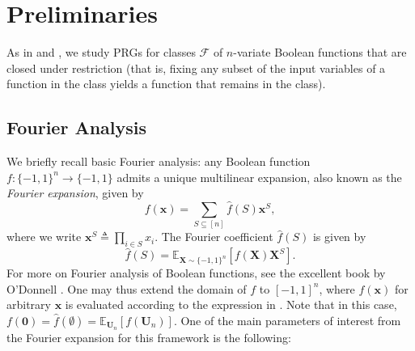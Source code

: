 \section{Preliminaries}
\label{sec:preliminaries}
As in \cite{CHHL} and \cite{CHLT}, we study PRGs for classes $\mathcal{F}$ of $n$-variate Boolean functions that are closed under restriction (that is, fixing any subset of the input variables of a function in the class yields a function that remains in the class). 














































\subsection{Fourier Analysis} \label{subsec:fourier}
We briefly recall basic Fourier analysis: any Boolean function $f:\{-1,1\}^n \to \{-1,1\}$ admits a unique multilinear expansion, also known as the \emph{Fourier expansion}, given by 
\begin{equation}
\label{eq:fourierexpansion}
    f(\mathbf{x})=\sum_{S\subseteq [n]} \hat{f}(S)\mathbf{x}^S,
\end{equation}
where we write $\mathbf{x}^S\triangleq \prod_{i\in S} x_i$. The   Fourier coefficient $\hat{f}(S)$ is given by
\begin{equation*}
    \hat{f}(S)=\mathbb{E}_{\mathbf{X}\sim \{-1,1\}^n}[f(\mathbf{X})\mathbf{X}^S].
\end{equation*}
For more on Fourier analysis of Boolean functions, see the excellent book by O'Donnell \cite{ODonnelBook}. One may thus extend the domain of $f$ to $[-1,1]^n$, where $f(\mathbf{x})$ for arbitrary $\mathbf{x}$ is evaluated according to the expression in . Note that in this case, $f(\mathbf{0})=\hat{f}(\emptyset)=\mathbb{E}_{\mathbf{U}_n}[f(\mathbf{U}_n)]$. One of the main parameters of interest from the Fourier expansion for this framework is the following:



